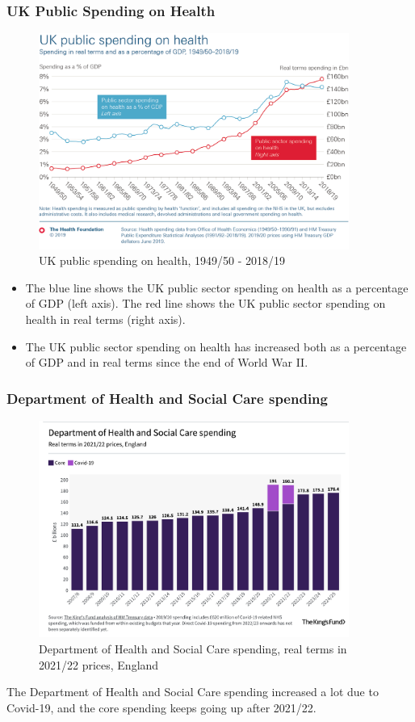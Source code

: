         \subsubsection{UK Public Spending on Health}         
            \begin{figure}[H]
                \centering
                \includegraphics[width=4in]{images/ch3/6.png}
                \caption{UK public spending on health, 1949/50 - 2018/19}
            \end{figure} 
            \begin{itemize}           
                \item The blue line shows the UK public sector spending on health as a percentage of GDP (left axis). The red line shows the UK public sector spending on health in real terms (right axis).
                \item The UK public sector spending on health has increased both as a percentage of GDP and in real terms since the end of World War II.
            \end{itemize}

        \subsubsection{Department of Health and Social Care spending} 
            \begin{figure}[H]
                \centering
                \includegraphics[width=4in]{images/ch3/7.png}
                \caption{Department of Health and Social Care spending, real terms in 2021/22 prices, England}
            \end{figure} 
                The Department of Health and Social Care spending increased a lot due to Covid-19, and the core spending keeps going up after 2021/22.


